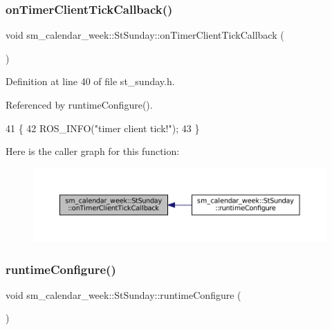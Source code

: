 \subsubsection{\texorpdfstring{on\+Timer\+Client\+Tick\+Callback()}{onTimerClientTickCallback()}}
{\footnotesize\ttfamily void sm\+\_\+calendar\+\_\+week\+::\+St\+Sunday\+::on\+Timer\+Client\+Tick\+Callback (\begin{DoxyParamCaption}{ }\end{DoxyParamCaption})\hspace{0.3cm}{\ttfamily [inline]}}



Definition at line 40 of file st\+\_\+sunday.\+h.



Referenced by runtime\+Configure().


\begin{DoxyCode}
41     \{
42         ROS\_INFO(\textcolor{stringliteral}{"timer client tick!"});
43     \}
\end{DoxyCode}
Here is the caller graph for this function\+:
\nopagebreak
\begin{figure}[H]
\begin{center}
\leavevmode
\includegraphics[width=350pt]{structsm__calendar__week_1_1StSunday_a6bba2c59172fea49fc346a658b592557_icgraph}
\end{center}
\end{figure}
\mbox{\label{structsm__calendar__week_1_1StSunday_a28c840bf204044472162a7d3f14da28b}} 
\subsubsection{\texorpdfstring{runtime\+Configure()}{runtimeConfigure()}}
{\footnotesize\ttfamily void sm\+\_\+calendar\+\_\+week\+::\+St\+Sunday\+::runtime\+Configure (\begin{DoxyParamCaption}{ }\end{DoxyParamCaption})\hspace{0.3cm}{\ttfamily [inline]}}



